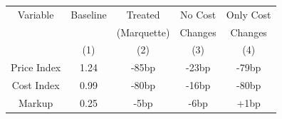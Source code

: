 \begin{tabular}{c|cccc}
Variable & Baseline & Treated & No Cost & Only Cost \\
 & & (Marquette) & Changes & Changes \\
\hline
 & (1) & (2) & (3) & (4) \\
Price Index & 1.24 & -85bp & -23bp & -79bp \\
Cost Index & 0.99 & -80bp & -16bp & -80bp \\
Markup & 0.25 & -5bp & -6bp & +1bp \\
\end{tabular}
